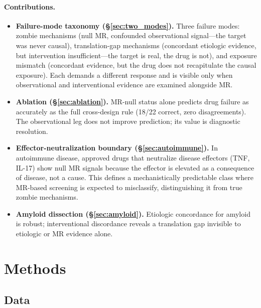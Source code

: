 \documentclass[11pt]{article}
\begin{document}
\paragraph{Contributions.}
\begin{itemize}
\item \textbf{Failure-mode taxonomy (\S\ref{sec:two_modes}).} Three failure modes: zombie mechanisms (null MR, confounded observational signal---the target was never causal), translation-gap mechanisms (concordant etiologic evidence, but intervention insufficient---the target is real, the drug is not), and exposure mismatch (concordant evidence, but the drug does not recapitulate the causal exposure). Each demands a different response and is visible only when observational and interventional evidence are examined alongside MR.
\item \textbf{Ablation (\S\ref{sec:ablation}).} MR-null status alone predicts drug failure as accurately as the full cross-design rule (18/22 correct, zero disagreements). The observational leg does not improve prediction; its value is diagnostic resolution.
\item \textbf{Effector-neutralization boundary (\S\ref{sec:autoimmune}).} In autoimmune disease, approved drugs that neutralize disease effectors (TNF, IL-17) show null MR signals because the effector is elevated as a consequence of disease, not a cause. This defines a mechanistically predictable class where MR-based screening is expected to misclassify, distinguishing it from true zombie mechanisms.
\item \textbf{Amyloid dissection (\S\ref{sec:amyloid}).} Etiologic concordance for amyloid is robust; interventional discordance reveals a translation gap invisible to etiologic or MR evidence alone.
\end{itemize}

\section{Methods}

\subsection{Data}
\end{document}

